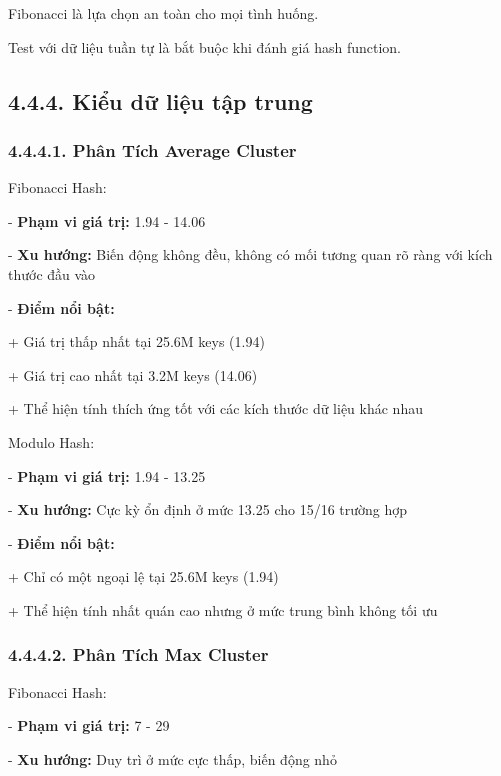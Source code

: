 \documentclass[12pt,a4paper]{report}
\begin{document}
     Fibonacci là lựa chọn an toàn cho mọi tình huống.
     
     Test với dữ liệu tuần tự là bắt buộc khi đánh giá hash function.
\subsection*{4.4.4. Kiểu dữ liệu tập trung}
\subsubsection*{4.4.4.1. Phân Tích Average Cluster}
\noindent \indent Fibonacci Hash:

    - \textbf{Phạm vi giá trị:} 1.94 - 14.06
    
    - \textbf{Xu hướng:} Biến động không đều, không có mối tương quan rõ ràng với kích thước đầu vào
    
    - \textbf{Điểm nổi bật:}
    
        \hspace{0.5cm}+ Giá trị thấp nhất tại 25.6M keys (1.94)
        
        \hspace{0.5cm}+ Giá trị cao nhất tại 3.2M keys (14.06)
        
        \hspace{0.5cm}+ Thể hiện tính thích ứng tốt với các kích thước dữ liệu khác nhau

Modulo Hash:

    - \textbf{Phạm vi giá trị:} 1.94 - 13.25
    
    - \textbf{Xu hướng:} Cực kỳ ổn định ở mức 13.25 cho 15/16 trường hợp
    
    - \textbf{Điểm nổi bật:}

        \hspace{0.5cm}+ Chỉ có một ngoại lệ tại 25.6M keys (1.94)
        
        \hspace{0.5cm}+ Thể hiện tính nhất quán cao nhưng ở mức trung bình không tối ưu

\subsubsection*{4.4.4.2. Phân Tích Max Cluster}

\noindent \indent Fibonacci Hash:

    - \textbf{Phạm vi giá trị:} 7 - 29
    
    - \textbf{Xu hướng:} Duy trì ở mức cực thấp, biến động nhỏ
    
\end{document}
